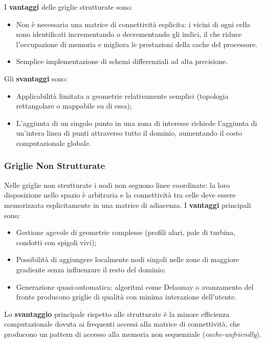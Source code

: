 I \textbf{vantaggi} delle griglie strutturate sono:
\begin{itemize}
  \item Non è necessaria una matrice di connettività esplicita: i vicini di ogni cella sono
    identificati incrementando o decrementando gli indici, il che riduce l'occupazione di memoria
    e migliora le prestazioni della cache del processore.
  \item Semplice implementazione di schemi differenziali ad alta precisione.
\end{itemize}

Gli \textbf{svantaggi} sono:
\begin{itemize}
  \item Applicabilità limitata a geometrie relativamente semplici (topologia rettangolare o
    mappabile su di essa);
  \item L'aggiunta di un singolo punto in una zona di interesse richiede l'aggiunta di un'intera
    linea di punti attraverso tutto il dominio, aumentando il costo computazionale globale.
\end{itemize}

\subsubsection{Griglie Non Strutturate}

Nelle griglie non strutturate i nodi non seguono linee coordinate: la loro disposizione nello
spazio è arbitraria e la connettività tra celle deve essere memorizzata esplicitamente in una
matrice di adiacenza. I \textbf{vantaggi} principali sono:
\begin{itemize}
  \item Gestione agevole di geometrie complesse (profili alari, pale di turbina, condotti con
    spigoli vivi);
  \item Possibilità di aggiungere localmente nodi singoli nelle zone di maggiore gradiente senza
    influenzare il resto del dominio;
  \item Generazione quasi-automatica: algoritmi come Delaunay o avanzamento del fronte producono
    griglie di qualità con minima interazione dell'utente.
\end{itemize}

Lo \textbf{svantaggio} principale rispetto alle strutturate è la minore efficienza computazionale
dovuta ai frequenti accessi alla matrice di connettività, che producono un pattern di accesso
alla memoria non sequenziale (\textit{cache-unfriendly}).

